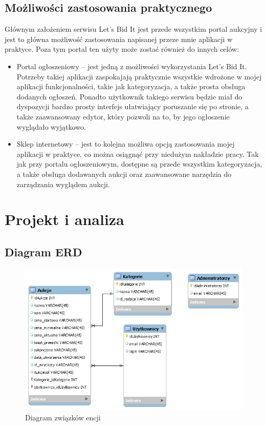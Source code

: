 \documentclass[brudnopis]{xmgr}
\begin{document}
\section{Możliwości zastosowania praktycznego}
Głównym założeniem serwisu Let's Bid It jest przede wszystkim portal aukcyjny i jest to główna możliwość zastosowania napisanej przeze mnie aplikacji w praktyce. Poza tym portal ten użyty może zostać również do innych celów:

\begin{itemize}

\item Portal ogłoszeniowy – jest jedną z możliwości wykorzystania Let's Bid It. Potrzeby takiej aplikacji zaspokajają praktycznie wszystkie wdrożone w mojej aplikacji funkcjonalności, takie jak kategoryzacja, a także prosta obsługa dodanych ogłoszeń. Ponadto użytkownik takiego  serwisu będzie miał do dyspozycji bardzo prosty interfejs ułatwiający poruszanie się po stronie, a także zaawansowany edytor, który pozwoli na to, by jego ogłoszenie wyglądało wyjątkowo.

\item Sklep internetowy – jest to kolejna możliwa opcją zastosowania mojej aplikacji w praktyce, co można osiągnąć przy niedużym nakładzie pracy. Tak jak przy portalu ogłoszeniowym, dostępne są przede wszystkim kategoryzacja, a także obsługa dodawanych aukcji oraz zaawansowane narzędzia do zarządzania wyglądem aukcji.

\end{itemize}

\chapter{Projekt i analiza}

\section{Diagram ERD}

\begin{figure}[!tbh]
\centering
\includegraphics[width=\linewidth]{erd}
\caption{Diagram związków encji\label{RYS.1}}
\end{figure}
\end{document}
